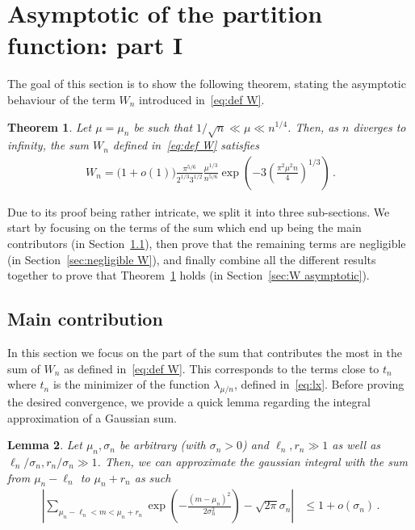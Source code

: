 \documentclass{article}
\newcommand{\1}{\mathbbm{1}}								%
\newtheorem{theorem}{Theorem}[section]
\newtheorem{lemma}[theorem]{Lemma}
\theoremstyle{definition}
\numberwithin{equation}{section}
\begin{document}
\section{Asymptotic of the partition function: part I}\label{sec:part fun 1}

The goal of this section is to show the following theorem, stating the asymptotic behaviour of the term $W_n$ introduced in~\eqref{eq:def W}.

\begin{theorem}\label{thm:W asympt}
    Let $\mu=\mu_n$ be such that $1/\sqrt{n}\ll\mu\ll n^{1/4}$.
    Then, as $n$ diverges to infinity, the sum $W_n$ defined in~\eqref{eq:def W} satisfies
    \begin{align*}
        W_n=\big(1+o(1)\big)\frac{\pi^{5/6}}{2^{1/3}3^{1/2}}\frac{\mu^{1/3}}{n^{5/6}}\exp\left(-3\left(\frac{\pi^2\mu^2n}{4}\right)^{1/3}\right)\,.
    \end{align*}
\end{theorem}

Due to its proof being rather intricate, we split it into three sub-sections.
We start by focusing on the terms of the sum which end up being the main contributors (in Section~\ref{sec:main W}), then prove that the remaining terms are negligible (in Section~\ref{sec:negligible W}), and finally combine all the different results together to prove that Theorem~\ref{thm:W asympt} holds (in Section~\ref{sec:W asymptotic}).

\subsection{Main contribution}\label{sec:main W}

In this section we focus on the part of the sum that contributes the most in the sum of $W_n$ as defined in~\eqref{eq:def W}.
This corresponds to the terms close to $t_n$ where $t_n$ is the minimizer of the function $\lambda_{\mu/n}$, defined in~\eqref{eq:lx}.
Before proving the desired convergence, we provide a quick lemma regarding the integral approximation of a Gaussian sum.

\begin{lemma}\label{lem:int approx}
    Let $\mu_n,\sigma_n$ be arbitrary (with $\sigma_n>0$) and $\ell_n,r_n\gg1$ as well as $\ell_n/\sigma_n,r_n/\sigma_n\gg1$.
    Then, we can approximate the gaussian integral with the sum from $\mu_n-\ell_n$ to $\mu_n+r_n$ as such
    \begin{align*}
        \left|\sum_{\mu_n-\ell_n<m<\mu_n+r_n}\exp\left(-\frac{(m-\mu_n)^2}{2\sigma_n^2}\right)-\sqrt{2\pi}\sigma_n\right|&\leq1+o(\sigma_n)\,.
    \end{align*}
\end{lemma}
\end{document}
